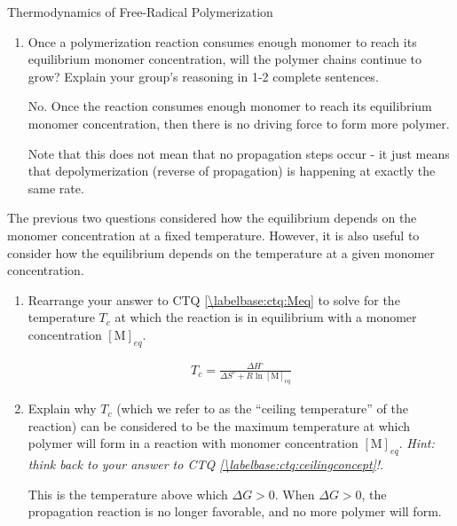\begin{activity}{Thermodynamics of Free-Radical Polymerization}
\begin{ctqs}
\begin{enumerate}
			\item Once a polymerization reaction consumes enough monomer to reach its equilibrium monomer concentration, will the polymer chains continue to grow?  Explain your group's reasoning in 1-2 complete sentences.
				
				\begin{solution}[1.5in]
					No. Once the reaction consumes enough monomer to reach its equilibrium monomer concentration, then there is no driving force to form more polymer.
					
					Note that this does not mean that no propagation steps occur - it just means that depolymerization (reverse of propagation) is happening at exactly the same rate.
				\end{solution}
				
		\end{enumerate}
	
	\question The previous two questions considered how the equilibrium depends on the monomer concentration at a fixed temperature. However, it is also useful to consider how the equilibrium depends on the temperature at a given monomer concentration.
	
		\begin{enumerate}
		
			\item Rearrange your answer to CTQ \ref{\labelbase:ctq:Meq} to solve for the temperature $T_c$ at which the reaction is in equilibrium with a monomer concentration $[\text{M}]_{eq}$.
				
				\begin{solution}[1in]
					\begin{align*}
						T_c = \frac{\Delta H^\circ}{\Delta S^\circ + R \ln [\text{M}]_{eq}}
					\end{align*}
				\end{solution}
				
			\item Explain why $T_c$ (which we refer to as the ``ceiling temperature'' of the reaction) can be considered to be the maximum temperature at which polymer will form in a reaction with monomer concentration $[\text{M}]_{eq}$. \emph{Hint: think back to your answer to CTQ \ref{\labelbase:ctq:ceilingconcept}!}.
				
				\begin{solution}[1.5in]
					This is the temperature above which $\Delta G > 0$.  When $\Delta G > 0$, the propagation reaction is no longer favorable, and no more polymer will form.
				\end{solution}
				

\end{enumerate}
\end{ctqs}
\end{activity}
